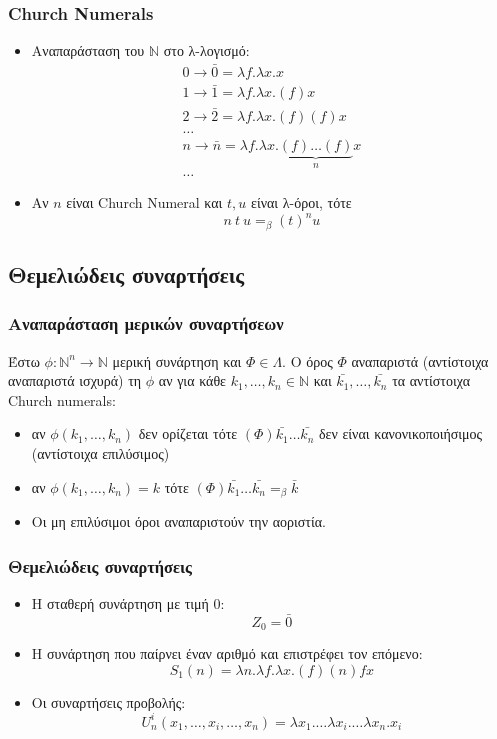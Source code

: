 \documentclass{beamer}
\begin{document}
\begin{frame}
  \frametitle{Church Numerals}
  \begin{itemize}
  \item Αναπαράσταση του $ \mathbb{N} $ στο λ-λογισμό:
    \pause
    $$
    \begin{array}{l}
      0 \rightarrow \bar{0} = \lambda f . \lambda x . x \\
      1 \rightarrow \bar{1} = \lambda f . \lambda x . (f) x \\
      2 \rightarrow \bar{2} = \lambda f . \lambda x . (f) (f) x \\
      \ldots \\
      n \rightarrow \bar{n} = \lambda f . \lambda x . \underbrace{(f)
        \ldots (f)}_n x \\
      \ldots
    \end{array}
    $$
    \pause
  \item Αν $n $ είναι Church Numeral και $t, u$ είναι λ-όροι, τότε
    $$ n\:t\:u =_\beta (t)^n u $$
  \end{itemize}
\end{frame}

\subsection{Θεμελιώδεις συναρτήσεις}

\begin{frame}
  \frametitle{Αναπαράσταση μερικών συναρτήσεων}
  Έστω $\phi : \mathbb{N}^n \rightarrow \mathbb{N}$ μερική συνάρτηση
  και $\Phi \in \Lambda $. O όρος $\Phi$ αναπαριστά (αντίστοιχα
  αναπαριστά ισχυρά) τη $\phi$ αν για κάθε $k_1,\ldots, k_n \in
  \mathbb{N}$ και $ \bar{k_1}, \ldots, \bar{k_n}$ τα
  αντίστοιχα Church numerals: \pause
  \begin{itemize}
  \item αν $\phi(k_1,\ldots,k_n)$ δεν ορίζεται τότε $(\Phi)
    \bar{k_1} \ldots \bar{k_n}$ δεν είναι
    κανονικοποιήσιμος (αντίστοιχα επιλύσιμος) \pause
  \item αν $\phi(k_1,\ldots,k_n) = k$ τότε $(\Phi) \bar{k_1}
    \ldots \bar{k_n} =_\beta \bar{k}$ \pause
  \item Οι μη επιλύσιμοι όροι αναπαριστούν την αοριστία.
  \end{itemize}
\end{frame}

\begin{frame}
  \frametitle{Θεμελιώδεις συναρτήσεις}
  \begin{itemize}
  \item Η σταθερή συνάρτηση με τιμή 0:
    $$Z_0=\bar{0}$$
    \pause
  \item Η συνάρτηση που παίρνει έναν αριθμό και επιστρέφει τον
    επόμενο:
    $$S_1(n)=\lambda n . \lambda f . \lambda x . (f) (n) f x$$
    \pause
  \item Οι συναρτήσεις προβολής: $$U^i_n(x_1,\ldots,x_i,\ldots,x_n)=
    \lambda x_1 . \ldots \lambda x_i . \ldots \lambda x_n . x_i$$
  \end{itemize}
\end{frame}
\end{document}
